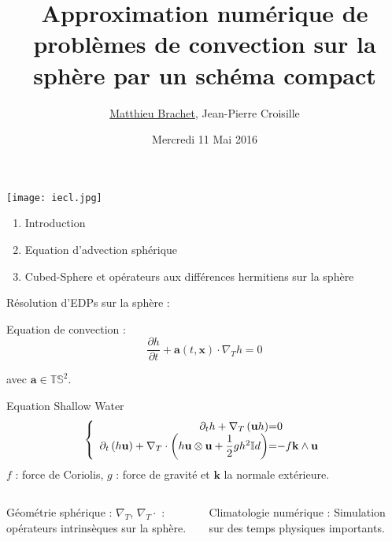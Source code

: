 \documentclass[11pt]{beamer}
\title{Approximation numérique de problèmes de convection sur la sphère par un schéma compact}
\author[M. Brachet]{\underline{Matthieu Brachet}, Jean-Pierre Croisille}
\date[11.05.2016]{Mercredi 11 Mai 2016}
\institute[IECL]{Institut Elie Cartan de Lorraine (Metz)}
\begin{document}
\begin{frame}
\titlepage
\texttt{[image: iecl.jpg]}
\end{frame}

\begin{frame}
\begin{enumerate}
\item Introduction

\item Equation d'advection sphérique

\item Cubed-Sphere et opérateurs aux différences hermitiens sur la sphère
\end{enumerate}
\end{frame}


\begin{frame}
Résolution d'EDPs sur la sphère :
\begin{block}{Equation de convection :}
\begin{equation*}
\dfrac{\partial h}{\partial t} + \mathbf{a} \left( t, \mathbf{x}\right) \cdot \nabla_T h = 0
\end{equation*}

avec $\mathbf{a} \in \mathbb{T} \mathbb{S}^2$.
\end{block}

\begin{block}{Equation Shallow Water}
\begin{equation*}
\left \{
\begin{array}{r @{=} l}
\partial_t h + \nabla_T \left( \mathbf{u} h \right) & 0\\
\partial_t \left(h \mathbf{u}\right) + \nabla_T \cdot \left( h \mathbf{u} \otimes \mathbf{u} + \dfrac{1}{2} g h^2 \mathbb{I}d \right) & -f \mathbf{k} \wedge \mathbf{u} 
\end{array}
\right.
\end{equation*}
$f$ : force de Coriolis, $g$ : force de gravité et $\mathbf{k}$ la normale extérieure.
\end{block}

\begin{columns}
\begin{block}{Géométrie sphérique :}
$\nabla_T$, $\nabla_T \cdot $ : opérateurs intrinsèques sur la sphère.
\end{block}

\begin{block}{Climatologie numérique : }
Simulation sur des temps physiques importants.
\end{block}

\end{columns}


\end{frame}
\end{document}

